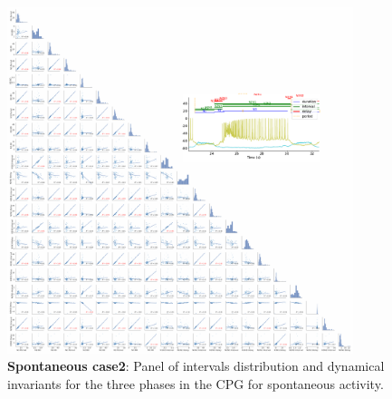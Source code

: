 \begin{figure}[htbp]
	\centering
	\includegraphics[width=0.9\textwidth]{./invariants/data/SUSSEX/prep2/images/3phases/panel_with_pairplot.pdf}
	\caption{\textbf{Spontaneous case2}: Panel of intervals distribution and dynamical invariants for the three phases in the CPG for spontaneous activity.}
	\label{fig:prep2 pairplot invariants}
\end{figure}


